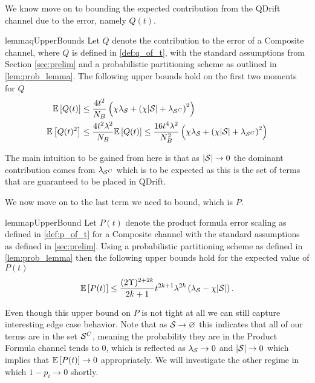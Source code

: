 We know move on to bounding the expected contribution from the QDrift channel due to the error, namely $Q(t)$. 
\begin{restatable}{lemma}{qUpperBounds} \label{lem:expect_q_upper_bounds}
Let $Q$ denote the contribution to the error of a Composite channel, where $Q$ is defined in \ref{def:q_of_t}, with the standard assumptions from Section \ref{sec:prelim} and a probabilistic partitioning scheme as outlined in \ref{lem:prob_lemma}. The following upper bounds hold on the first two moments for $Q$
\begin{align}
    \mathbb{E}\left[ Q(t) \right] &\leq \frac{4 t^2}{N_B} \left( \chi \lambda_{\mathcal{S}} + \left( \chi |\mathcal{S}| + \lambda_{\mathcal{S}^C} \right)^2 \right) \label{eq:expect_q_upper_bound} \\
    \mathbb{E}\left[ Q(t)^2 \right] &\leq \frac{4 t^2 \lambda^2}{N_B} \mathbb{E}\left[ Q(t) \right] \leq \frac{16 t^4 \lambda^2}{N_B^2} \left( \chi \lambda_{\mathcal{S}} + \left( \chi |\mathcal{S}| + \lambda_{\mathcal{S}^C} \right)^2 \right) \label{eq:expect_q_squared_upper_bound}
\end{align}
\end{restatable}

The main intuition to be gained from here is that as $|\mathcal{S}| \to 0$ the dominant contribution comes from $\lambda_{\mathcal{S}^C}$ which is to be expected as this is the set of terms that are guaranteed to be placed in QDrift.

We now move on to the last term we need to bound, which is $P$. 
\begin{restatable}{lemma}{pUpperBound} \label{lem:p_upper_bound}
Let $P(t)$ denote the product formula error scaling as defined in \ref{def:p_of_t} for a Composite channel with the standard assumptions as defined in \ref{sec:prelim}. Using a probabilistic partitioning scheme as defined in \ref{lem:prob_lemma} then the following upper bounds hold for the expected value of $P(t)$
\begin{equation}
    \mathbb{E}\left[ P(t) \right] \leq \frac{(2 \Upsilon)^{2 + 2k}}{2k+1} t^{2k+1} \lambda^{2k} \left( \lambda_{\mathcal{S}} - \chi |\mathcal{S}| \right) .\label{eq:p_upper_bound}
\end{equation}
\end{restatable}
Even though this upper bound on $P$ is not tight at all we can still capture interesting edge case behavior. Note that as $\mathcal{S} \to \varnothing$ this indicates that all of our terms are in the set $\mathcal{S}^C$, meaning the probability they are in the Product Formula channel tends to 0, which is reflected as $\lambda_{\mathcal{S}} \to 0$ and $|\mathcal{S}| \to 0$ which implies that $\mathbb{E}\left[ P(t) \right] \to 0$ appropriately. We will investigate the other 
regime in which $1 - p_i \to 0$ shortly. 

